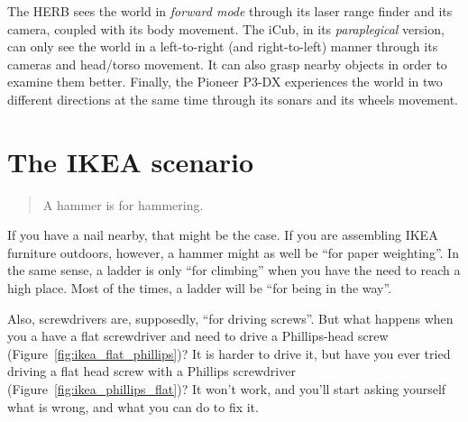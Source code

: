 \documentclass{article}
\begin{document}
The HERB sees the world in \emph{forward mode} through its laser range finder
and its camera, coupled with its body movement. The iCub, in its
\emph{paraplegical} version, can only see the world in a left-to-right (and
right-to-left) manner through its cameras and head/torso movement. It can also
grasp nearby objects in order to examine them better. Finally, the Pioneer P3-DX
experiences the world in two different directions at the same time through its
sonars and its wheels movement. 


\section{The IKEA scenario}

\begin{quotation}
  A hammer is for hammering.
\end{quotation}

If you have a nail nearby, that might be the case. If you are assembling IKEA
furniture outdoors, however, a hammer might as well be ``for paper weighting''.
In the same sense, a ladder is only ``for climbing'' when you have the need to
reach a high place. Most of the times, a ladder will be
``for being in the way''.

Also, screwdrivers are, supposedly, ``for driving screws''. But what happens
when you a have a flat screwdriver and need to drive a Phillips-head screw
(Figure~\ref{fig:ikea_flat_phillips})? It is harder to drive it, but have you
ever tried driving a flat head screw with a Phillips screwdriver
(Figure~\ref{fig:ikea_phillips_flat})? It won't work, and you'll start asking
yourself what is wrong, and what you can do to fix it.
\end{document}
